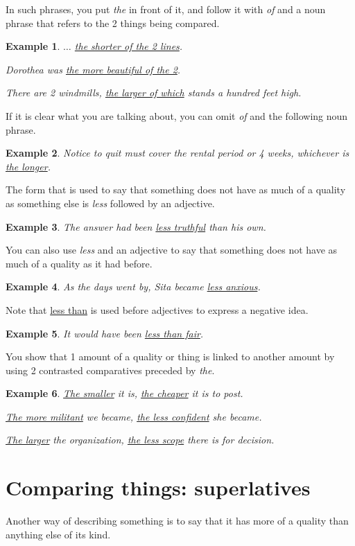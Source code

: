 \documentclass[oneside]{book}
\numberwithin{equation}{section}
\newtheorem{example}{Example}[section]
\begin{document}
In such phrases, you put \textit{the} in front of it, and follow it with \textit{of} and a noun phrase that refers to the 2 things being compared.
\begin{example}
    $\ldots$ \underline{the shorter of the 2 lines}.
    
    Dorothea was \underline{the more beautiful of the 2}.
    
    There are 2 windmills, \underline{the larger of which} stands a hundred feet high.
\end{example}
If it is clear what you are talking about, you can omit \textit{of} and the following noun phrase.
\begin{example}
    Notice to quit must cover the rental period or 4 weeks, whichever is \underline{the longer}.
\end{example}
%
\noindent{} The form that is used to say that something does not have as much of a quality as something else is \textit{less} followed by an adjective.
\begin{example}
    The answer had been \underline{less truthful} than his own.
\end{example}
You can also use \textit{less} and an adjective to say that something does not have as much of a quality as it had before.
\begin{example}
    As the days went by, Sita became \underline{less anxious}.
\end{example}
Note that \underline{less than} is used before adjectives to express a negative idea.
\begin{example}
    It would have been \underline{less than fair}.
\end{example}
%
\noindent{} You show that 1 amount of a quality or thing is linked to another amount by using 2 contrasted comparatives preceded by \textit{the}.
\begin{example}
    \underline{The smaller} it is, \underline{the cheaper} it is to post.
    
    \underline{The more militant} we became, \underline{the less confident} she became.
    
    \underline{The larger} the organization, \underline{the less scope} there is for decision.
\end{example}

\section{Comparing things: superlatives}
\noindent{} Another way of describing something is to say that it has more of a quality than anything else of its kind.
\end{document}
